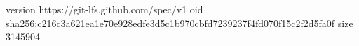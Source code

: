 version https://git-lfs.github.com/spec/v1
oid sha256:c216c3a621ea1e70e928edfe3d5c1b970cbfd7239237f4fd070f15c2f2d5fa0f
size 3145904
